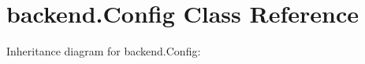 \hypertarget{classbackend_1_1Config}{}\section{backend.\+Config Class Reference}
\label{classbackend_1_1Config}


Inheritance diagram for backend.\+Config\+:

